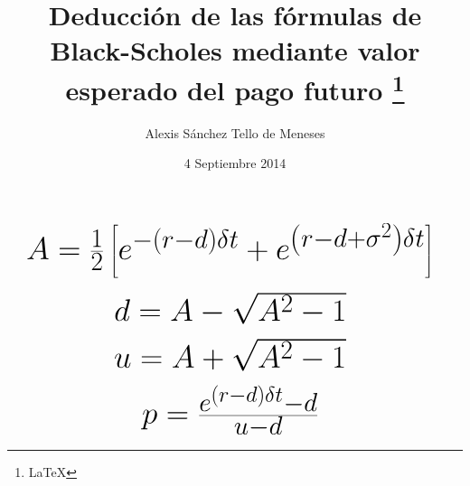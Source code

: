 \documentclass[32pt]{article}
\title{Deducci\'{o}n de las f\'{o}rmulas de Black-Scholes mediante valor esperado del pago futuro \footnote{\LaTeX}}
\author{Alexis S\'{a}nchez Tello de Meneses}
\date{4 Septiembre 2014}
\begin{document}
\maketitle

\begin{equation}
	\mbox{\Huge
	 $ A = \frac{1}{2}\left[e^{-\left(r-d\right)\delta t} + e^{\left(r-d+\sigma^{2}\right)\delta t}\right]$ }
\end{equation}


\begin{equation}
	\mbox{\Huge
	 $ d = A - \sqrt{A^{2}-1} $ }
\end{equation}


\begin{equation}
	\mbox{\Huge
	 $ u = A + \sqrt{A^{2}-1} $ }
\end{equation}


\begin{equation}
	\mbox{\Huge
	 $ p = \frac{e^{\left(r-d\right)\delta t}-d}{u-d}$ }
\end{equation}
\end{document}

